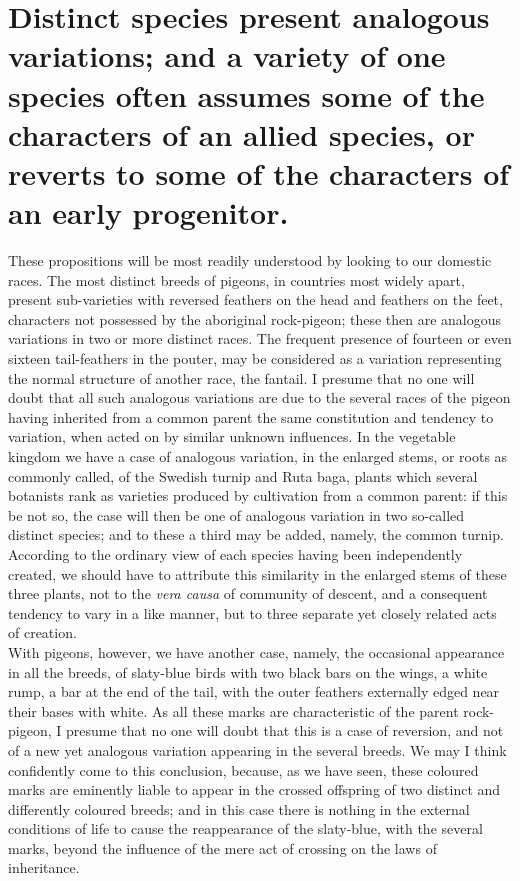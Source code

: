 \section{Distinct species present analogous variations; and a variety of one species often assumes some of the characters of an allied species, or reverts to some of the characters of an early progenitor.}
\indent These propositions will be most readily understood by looking to our domestic races. The most distinct breeds of pigeons, in countries most widely apart, present sub-varieties with reversed feathers on the head and feathers on the feet, characters not possessed by the aboriginal rock-pigeon; these then are analogous variations in two or more distinct races. The frequent presence of fourteen or even sixteen tail-feathers in the pouter, may be considered as a variation representing the normal structure of another race, the fantail. I presume that no one will doubt that all such analogous variations are due to the several races of the pigeon having inherited from a common parent the same constitution and tendency to variation, when acted on by similar unknown influences. In the vegetable kingdom we have a case of analogous variation, in the enlarged stems, or roots as commonly called, of the Swedish turnip and Ruta baga, plants which several botanists rank as varieties produced by cultivation from a common parent: if this be not so, the case will then be one of analogous variation in two so-called distinct species; and to these a third may be added, namely, the common turnip. According to the ordinary view of each species having been independently created, we should have to attribute this similarity in the enlarged stems of these three plants, not to the \emph{vera causa} of community of descent, and a consequent tendency to vary in a like manner, but to three separate yet closely related acts of creation.\\
\indent With pigeons, however, we have another case, namely, the occasional appearance in all the breeds, of slaty-blue birds with two black bars on the wings, a white rump, a bar at the end of the tail, with the outer feathers externally edged near their bases with white. As all these marks are characteristic of the parent rock-pigeon, I presume that no one will doubt that this is a case of reversion, and not of a new yet analogous variation appearing in the several breeds. We may I think confidently come to this conclusion, because, as we have seen, these coloured marks are eminently liable to appear in the crossed offspring of two distinct and differently coloured breeds; and in this case there is nothing in the external conditions of life to cause the reappearance of the slaty-blue, with the several marks, beyond the influence of the mere act of crossing on the laws of inheritance.\\
